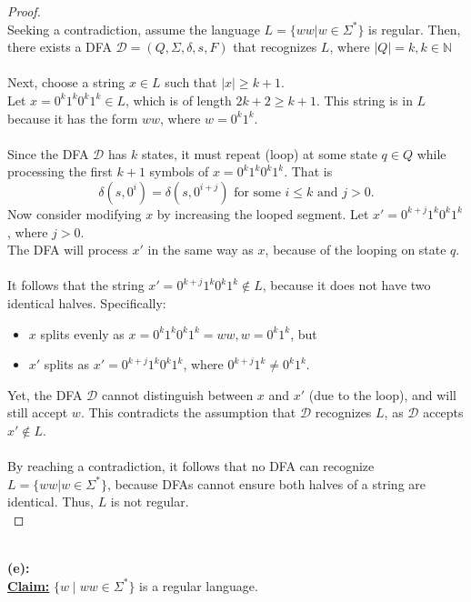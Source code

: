 \documentclass[12pt]{article}
\begin{document}
\begin{proof}
\leavevmode\\
    Seeking a contradiction, assume the language $L = \{ ww | w \in \Sigma^* \}$ is regular. Then, there exists a DFA $\mathcal{D} = (Q, \Sigma, \delta, s, F)$ that recognizes $L$, where $|Q| = k, k \in \mathbb{N}$ \\
    \\
    Next, choose a string $x \in L$ such that $|x| \geq k + 1$. \\
    Let $x = 0^k1^k0^k1^k \in L$, which is of length $2k + 2 \geq k + 1$. This string is in $L$ because it has the form $ww$, where $w = 0^k1^k$. \\
    \\
    Since the DFA $\mathcal{D}$ has $k$ states, it must repeat (loop) at some state $q \in Q$ while processing the first $k + 1$ symbols of $x = 0^k1^k0^k1^k$. That is
    \[
        \delta(s, 0^i) = \delta(s, 0^{i + j}) \text{ for some $i \leq k$ and $j > 0$.}
    \]
    Now consider modifying $x$ by increasing the looped segment. Let $x' = 0^{k + j}1^k0^k1^k$, where $j > 0$. \\
    The DFA will process $x'$ in the same way as $x$, because of the looping on state $q$. \\
    \\
    It follows that the string $x' = 0^{k + j}1^k0^k1^k \notin L$, because it does not have two identical halves. Specifically:
    \begin{itemize}
        \item $x$ splits evenly as $x = 0^k1^k0^k1^k = ww, w = 0^k1^k$, but
        \item $x'$ splits as $x' = 0^{k + j}1^k0^k1^k$, where $0^{k + j}1^k \neq 0^k1^k$.
    \end{itemize}
    Yet, the DFA $\mathcal{D}$ cannot distinguish between $x$ and $x'$ (due to the loop), and will still accept $w$. This contradicts the assumption that $\mathcal{D}$ recognizes $L$, as $\mathcal{D}$ accepts $x' \notin L$. \\
    \\
    By reaching a contradiction, it follows that no DFA can recognize $L = \{ ww | w \in \Sigma^* \}$, because DFAs cannot ensure both halves of a string are identical. Thus, $L$ is not regular. \\
\end{proof}
\leavevmode\\
\textbf{(e):} \\
\textbf{\underline{Claim:}} $\{ w \mid ww \in \Sigma^* \}$ is a regular language.
\end{document}
